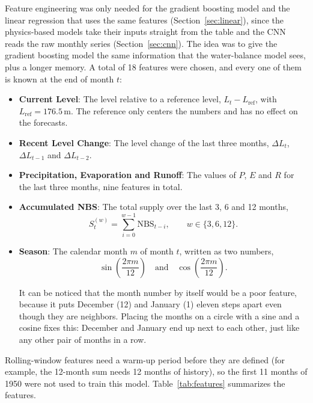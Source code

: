 \documentclass{article}
\begin{document}
Feature engineering was only needed for the gradient boosting model and the linear regression
that uses the same features (Section~\ref{sec:linear}), since the physics-based
models take their inputs straight from the table and the CNN reads the raw monthly series
(Section~\ref{sec:cnn}). The idea was to give the gradient boosting model
the same information that the water-balance model sees, plus a longer memory. A total of 18
features were chosen, and every one of them is known at the end of month $t$:
\begin{itemize}
\item \textbf{Current Level}: The level relative to a reference level, $L_t - L_{\mathrm{ref}}$,
with $L_{\mathrm{ref}} = 176.5$\,m. The reference only centers the numbers and has no effect on
the forecasts.
\item \textbf{Recent Level Change}: The level change of the last three months, $\Delta L_t$,
$\Delta L_{t-1}$ and $\Delta L_{t-2}$.
\item \textbf{Precipitation, Evaporation and Runoff}: The values of $P$, $E$ and $R$ for the
last three months, nine features in total.
\item \textbf{Accumulated NBS}: The total supply over the last 3, 6 and 12 months,
\begin{equation}
S^{(w)}_t = \sum_{i=0}^{w-1} \mathrm{NBS}_{t-i}, \qquad w \in \{3, 6, 12\}. \label{eq:accum}
\end{equation}
\item \textbf{Season}: The calendar month $m$ of month $t$, written as two numbers,
\begin{equation}
\sin\!\left(\frac{2\pi m}{12}\right) \quad \text{and} \quad \cos\!\left(\frac{2\pi m}{12}\right).
\label{eq:season}
\end{equation}

It can be noticed that the month number by itself would be a poor feature, because it puts
December (12) and January (1) eleven steps apart even though they are neighbors. Placing the
months on a circle with a sine and a cosine fixes this: December and January end up next to each
other, just like any other pair of months in a row.
\end{itemize}

Rolling-window features need a warm-up period before they are defined (for example, the
12-month sum needs 12 months of history), so the first 11 months of 1950 were not used to train
this model. Table~\ref{tab:features} summarizes the features.
\end{document}
